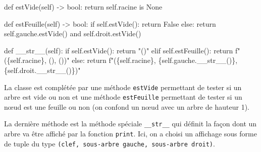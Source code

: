 \documentclass[
  letterpaper,
  DIV=11,
  numbers=noendperiod]{scrartcl}
\newenvironment{Shaded}{\begin{snugshade}}{\end{snugshade}}
\newcommand{\BuiltInTok}[1]{\textcolor[rgb]{0.00,0.23,0.31}{#1}}
\newcommand{\ControlFlowTok}[1]{\textcolor[rgb]{0.00,0.23,0.31}{#1}}
\newcommand{\FunctionTok}[1]{\textcolor[rgb]{0.28,0.35,0.67}{#1}}
\newcommand{\KeywordTok}[1]{\textcolor[rgb]{0.00,0.23,0.31}{#1}}
\newcommand{\NormalTok}[1]{\textcolor[rgb]{0.00,0.23,0.31}{#1}}
\newcommand{\OperatorTok}[1]{\textcolor[rgb]{0.37,0.37,0.37}{#1}}
\newcommand{\SpecialCharTok}[1]{\textcolor[rgb]{0.37,0.37,0.37}{#1}}
\newcommand{\SpecialStringTok}[1]{\textcolor[rgb]{0.13,0.47,0.30}{#1}}
\newcommand{\StringTok}[1]{\textcolor[rgb]{0.13,0.47,0.30}{#1}}
\newcommand{\VariableTok}[1]{\textcolor[rgb]{0.07,0.07,0.07}{#1}}
\begin{document}
\begin{Shaded}
\begin{Highlighting}[]
    \KeywordTok{def}\NormalTok{ estVide(}\VariableTok{self}\NormalTok{) }\OperatorTok{{-}\textgreater{}} \BuiltInTok{bool}\NormalTok{:}
        \ControlFlowTok{return} \VariableTok{self}\NormalTok{.racine }\KeywordTok{is} \VariableTok{None}

    \KeywordTok{def}\NormalTok{ estFeuille(}\VariableTok{self}\NormalTok{) }\OperatorTok{{-}\textgreater{}} \BuiltInTok{bool}\NormalTok{:}
        \ControlFlowTok{if} \VariableTok{self}\NormalTok{.estVide():}
            \ControlFlowTok{return} \VariableTok{False}
        \ControlFlowTok{else}\NormalTok{:}
            \ControlFlowTok{return} \VariableTok{self}\NormalTok{.gauche.estVide() }\KeywordTok{and} \VariableTok{self}\NormalTok{.droit.estVide()}

    \KeywordTok{def} \FunctionTok{\_\_str\_\_}\NormalTok{(}\VariableTok{self}\NormalTok{):}
        \ControlFlowTok{if} \VariableTok{self}\NormalTok{.estVide():}
            \ControlFlowTok{return} \StringTok{"()"}
        \ControlFlowTok{elif} \VariableTok{self}\NormalTok{.estFeuille():}
            \ControlFlowTok{return} \SpecialStringTok{f"(\textquotesingle{}}\SpecialCharTok{\{}\VariableTok{self}\SpecialCharTok{.}\NormalTok{racine}\SpecialCharTok{\}}\SpecialStringTok{\textquotesingle{}, (), ())"}
        \ControlFlowTok{else}\NormalTok{:}
            \ControlFlowTok{return} \SpecialStringTok{f"(\textquotesingle{}}\SpecialCharTok{\{}\VariableTok{self}\SpecialCharTok{.}\NormalTok{racine}\SpecialCharTok{\}}\SpecialStringTok{\textquotesingle{}, }\SpecialCharTok{\{}\VariableTok{self}\SpecialCharTok{.}\NormalTok{gauche}\SpecialCharTok{.}\FunctionTok{\_\_str\_\_}\NormalTok{()}\SpecialCharTok{\}}\SpecialStringTok{, }\SpecialCharTok{\{}\VariableTok{self}\SpecialCharTok{.}\NormalTok{droit}\SpecialCharTok{.}\FunctionTok{\_\_str\_\_}\NormalTok{()}\SpecialCharTok{\}}\SpecialStringTok{)"}
\end{Highlighting}
\end{Shaded}

La classe est complétée par une méthode \texttt{estVide} permettant de
tester si un arbre est vide ou non et une méthode \texttt{estFeuille}
permettant de tester si un nœud est une feuille ou non (on confond un
nœud avec un arbre de hauteur 1).

La dernière méthode est la méthode spéciale \texttt{\_\_str\_\_} qui
définit la façon dont un arbre va être affiché par la fonction
\texttt{print}. Ici, on a choisi un affichage sous forme de tuple du
type \texttt{(clef,\ sous-arbre\ gauche,\ sous-arbre\ droit)}.
\end{document}
